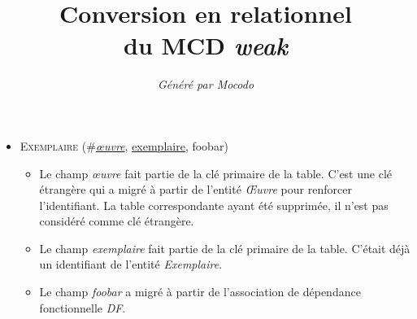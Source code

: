 \documentclass[a4paper]{article}
\title{Conversion en relationnel\\du MCD \emph{weak}}
\author{\emph{Généré par Mocodo}}
\newcommand{\relat}[1]{\textsc{#1}}
\newcommand{\attr}[1]{#1}
\newcommand{\prim}[1]{\uline{#1}}
\newcommand{\foreign}[1]{\#\textsl{#1}}
\begin{document}
\maketitle

\begin{itemize}
  \item \relat{Exemplaire} (\foreign{\prim{œuvre}}, \prim{exemplaire}, \attr{foobar})
  \begin{itemize}
    \item Le champ \emph{œuvre} fait partie de la clé primaire de la table. C'est une clé étrangère qui a migré à partir de l'entité \emph{Œuvre} pour renforcer l'identifiant. La table correspondante ayant été supprimée, il n'est pas considéré comme clé étrangère.
    \item Le champ \emph{exemplaire} fait partie de la clé primaire de la table. C'était déjà un identifiant de l'entité \emph{Exemplaire}.
    \item Le champ \emph{foobar} a migré à partir de l'association de dépendance fonctionnelle \emph{DF}.
  \end{itemize}

\end{itemize}
\end{document}
